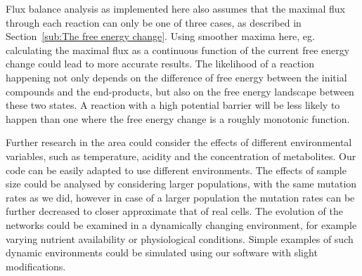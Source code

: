 \documentclass[a4paper,12pt]{article}
\begin{document}
Flux balance analysis as implemented here also assumes that the maximal flux through each reaction can only be one of three cases, as described in Section~\ref{sub:The free energy change}. Using smoother maxima here, eg. calculating the maximal flux as a continuous function of the current free energy change could lead to more accurate results. The likelihood of a reaction happening not only depends on the difference of free energy between the initial compounds and the end-products, but also on the free energy landscape between these two states. A reaction with a high potential barrier will be less likely to happen than one where the free energy change is a roughly monotonic function. 



	
	
	
	Further research in the area could consider the effects of different environmental variables, such as temperature, acidity and the concentration of metabolites. Our code can be easily adapted to use different environments. The effects of sample size could be analysed by considering larger populations, with the same mutation rates as we did, however in case of a larger population the mutation rates can be further decreased to closer approximate that of real cells. The evolution of the networks could be examined in a dynamically changing environment, for example varying nutrient availability or physiological conditions. Simple examples of such dynamic environments could be simulated using our software with slight modifications. 
	
\end{document}
